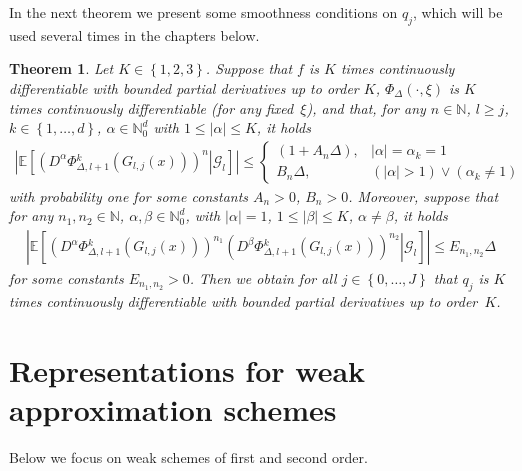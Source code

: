 \documentclass[11pt,a4paper]{amsart}
\theoremstyle{plain}
\newtheorem{theorem}{Theorem}[section]
\theoremstyle{definition}
\theoremstyle{remark}
\numberwithin{equation}{section}
\newcommand*{\EE}{\mathbb E}
\newcommand*{\RR}{\mathbb R}
\newcommand*{\NN}{\mathbb{N}}
\begin{document}
In the next theorem we present some smoothness conditions on $q_j$, which will be used several times in the chapters below.
\begin{theorem}
\label{smooth:func_assump_general}
Let $K\in\left\{1,2,3\right\}$. Suppose that $f$ is $K$ times continuously differentiable with bounded partial derivatives up to order $K$,
$\Phi_\Delta(\cdot,\xi)$ is $K$ times continuously
differentiable (for any fixed~$\xi$),
and that, for any $n\in\NN$, $l\ge j$, $k\in\left\{1,\ldots,d\right\}$, $\alpha\in\NN_0^d$ with $1\le\left|\alpha\right|\le K$, it holds
\begin{align}
\label{smooth:Phi_assump_1}
\left|\EE\left[\left.\left(D^\alpha\Phi{}_{\Delta,l+1}^{k}(G_{l,j}(x))\right)^{n}\right|\mathcal{G}_{l}\right]\right|\leq\begin{cases}
(1+A_{n}\Delta), & \left|\alpha\right|=\alpha_k=1\\
B_{n}\Delta, & (\left|\alpha\right|>1)\vee (\alpha_k\ne 1)
\end{cases}
\end{align}
with probability one for some constants $A_{n}>0$, $B_{n}>0$.
Moreover, suppose that for any $n_1,n_2\in\NN$, $\alpha,\beta\in\NN_0^d$,
with $|\alpha|=1$,
$1\le\left|\beta\right|\le K$,
$\alpha\ne\beta$,
it holds
\begin{align}
\label{smooth:Phi_assump_2 new}
\left|\EE\left[\left.\left(D^{\alpha}\Phi{}_{\Delta,l+1}^{k}(G_{l,j}(x))\right)^{n_1}\left(D^{\beta}\Phi{}_{\Delta,l+1}^{k}(G_{l,j}(x))\right)^{n_2}\right|\mathcal{G}_{l}\right]\right|\leq E_{n_1,n_2}\Delta
\end{align}
for some constants $E_{n_1,n_2}>0$. Then we obtain for all $j\in\left\{0,\ldots,J\right\}$ that $q_j$ is $K$ times continuously differentiable with bounded partial derivatives up to order~$K$. 
\end{theorem}




\section{Representations for weak approximation schemes}
\label{sec:weak}

Below we focus on weak schemes of first and second order.
\end{document}
